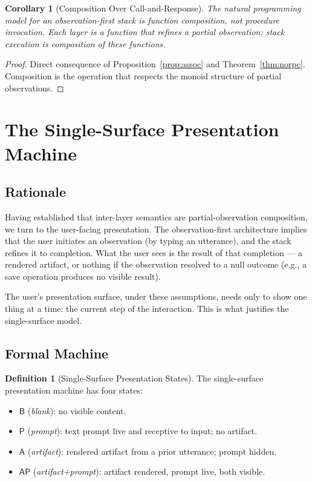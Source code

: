 \documentclass[11pt,a4paper]{article}
\newtheorem{corollary}[theorem]{Corollary}
\theoremstyle{definition}
\newtheorem{definition}[theorem]{Definition}
\theoremstyle{remark}
\begin{document}
\begin{corollary}[Composition Over Call-and-Response]
\label{cor:composition}
The natural programming model for an observation-first stack is function composition, not procedure invocation. Each layer is a function that refines a partial observation; stack execution is composition of these functions.
\end{corollary}

\begin{proof}
Direct consequence of Proposition~\ref{prop:assoc} and Theorem~\ref{thm:norpc}. Composition is the operation that respects the monoid structure of partial observations.
\end{proof}

\section{The Single-Surface Presentation Machine}
\label{sec:single-surface}

\subsection{Rationale}

Having established that inter-layer semantics are partial-observation composition, we turn to the user-facing presentation. The observation-first architecture implies that the user initiates an observation (by typing an utterance), and the stack refines it to completion. What the user sees is the result of that completion --- a rendered artifact, or nothing if the observation resolved to a null outcome (e.g., a save operation produces no visible result).

The user's presentation surface, under these assumptions, needs only to show one thing at a time: the current step of the interaction. This is what justifies the single-surface model.

\subsection{Formal Machine}

\begin{definition}[Single-Surface Presentation States]
\label{def:ssp}
The single-surface presentation machine has four states:
\begin{itemize}
    \item $\mathsf{B}$ (\emph{blank}): no visible content.
    \item $\mathsf{P}$ (\emph{prompt}): text prompt live and receptive to input; no artifact.
    \item $\mathsf{A}$ (\emph{artifact}): rendered artifact from a prior utterance; prompt hidden.
    \item $\mathsf{AP}$ (\emph{artifact+prompt}): artifact rendered, prompt live, both visible.
\end{itemize}
\end{definition}
\end{document}
